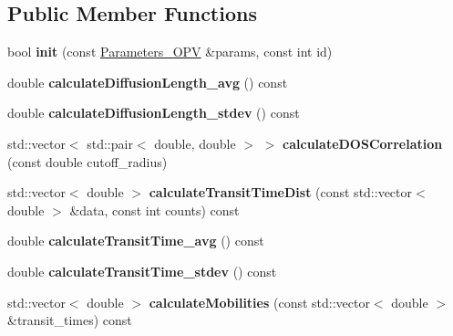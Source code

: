 \subsection*{Public Member Functions}
\begin{DoxyCompactItemize}
\item 
\mbox{\label{class_o_s_c___sim_a7c6cce40287a60c271509c1f3d8eef9a}} 
bool {\bfseries init} (const \hyperlink{struct_parameters___o_p_v}{Parameters\+\_\+\+O\+PV} \&params, const int id)
\item 
\mbox{\label{class_o_s_c___sim_a62aa25ac6740cea4efab1dcc7f88c5d5}} 
double {\bfseries calculate\+Diffusion\+Length\+\_\+avg} () const
\item 
\mbox{\label{class_o_s_c___sim_a858300b2a76f1a1b24747d11869a1f4a}} 
double {\bfseries calculate\+Diffusion\+Length\+\_\+stdev} () const
\item 
\mbox{\label{class_o_s_c___sim_afdd01fa07d004b0c37ce86ee171a60b8}} 
std\+::vector$<$ std\+::pair$<$ double, double $>$ $>$ {\bfseries calculate\+D\+O\+S\+Correlation} (const double cutoff\+\_\+radius)
\item 
\mbox{\label{class_o_s_c___sim_a176ab132e314dfd509e8feb89687f163}} 
std\+::vector$<$ double $>$ {\bfseries calculate\+Transit\+Time\+Dist} (const std\+::vector$<$ double $>$ \&data, const int counts) const
\item 
\mbox{\label{class_o_s_c___sim_a99e37cc427f843a92d58c6fa9b13fffe}} 
double {\bfseries calculate\+Transit\+Time\+\_\+avg} () const
\item 
\mbox{\label{class_o_s_c___sim_a7e7da89362449d58373a31c255a27d8f}} 
double {\bfseries calculate\+Transit\+Time\+\_\+stdev} () const
\item 
\mbox{\label{class_o_s_c___sim_a8cbaab921f75c2b1ccc85b42ed698c58}} 
std\+::vector$<$ double $>$ {\bfseries calculate\+Mobilities} (const std\+::vector$<$ double $>$ \&transit\+\_\+times) const
\item 
\mbox{\label{class_o_s_c___sim_aef139f85af869c000b362b2a17e46cff}} 

\end{DoxyCompactItemize}
